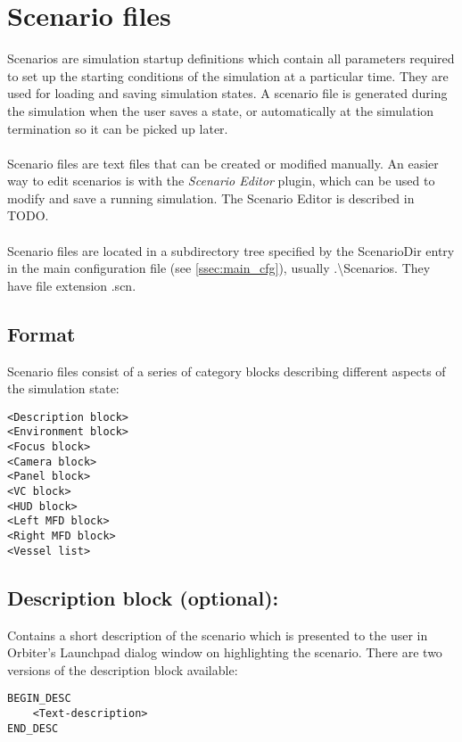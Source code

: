 \documentclass[Orbiter Developer Manual.tex]{subfiles}
\begin{document}
\section{Scenario files}
\label{sec:scn_files}
Scenarios are simulation startup definitions which contain all parameters required to set up the starting conditions of the simulation at a particular time. They are used for loading and saving simulation states. A scenario file is generated during the simulation when the user saves a state, or automatically at the simulation termination so it can be picked up later.\\
\\
Scenario files are text files that can be created or modified manually. An easier way to edit scenarios is with the \textit{Scenario Editor} plugin, which can be used to modify and save a running simulation. The Scenario Editor is described in TODO.\\
\\
Scenario files are located in a subdirectory tree specified by the ScenarioDir entry in the main configuration file (see \ref{ssec:main_cfg}), usually .\textbackslash Scenarios. They have file extension .scn.


\subsection*{Format}
Scenario files consist of a series of category blocks describing different aspects of the simulation state:

\begin{lstlisting}[language=OSFS]
<Description block>
<Environment block>
<Focus block>
<Camera block>
<Panel block>
<VC block>
<HUD block>
<Left MFD block>
<Right MFD block>
<Vessel list>
\end{lstlisting}


\subsection*{Description block (optional):}
Contains a short description of the scenario which is presented to the user in Orbiter's Launchpad dialog window on highlighting the scenario. There are two versions of the description block available:

\begin{lstlisting}[language=OSFS]
BEGIN_DESC
	<Text-description>
END_DESC
\end{lstlisting}
\end{document}
